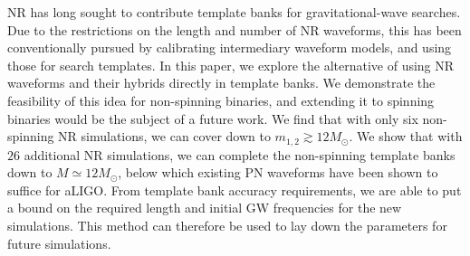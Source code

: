 NR has long sought to contribute template banks for gravitational-wave
searches. Due to the restrictions on the length and number of NR waveforms,
this has been conventionally pursued by calibrating intermediary
waveform models, and
using those for search templates. In this paper, we explore the alternative
of using NR waveforms and their hybrids directly in template banks.
We demonstrate the feasibility of this idea for non-spinning binaries,
and extending it to spinning binaries would be the subject of a future
work. We find that with only six non-spinning NR simulations, we can 
cover down to $m_{1,2}\gtrsim 12M_\odot$. We show that with
$26$ additional NR simulations, we can complete the non-spinning template
banks down to $M\simeq 12M_\odot$, below which existing PN waveforms 
have been shown to suffice for aLIGO. From template bank accuracy 
requirements, we are able to put a bound on the required length and 
initial GW frequencies for the new simulations. This method can therefore
be used to lay down the parameters for future simulations. 


